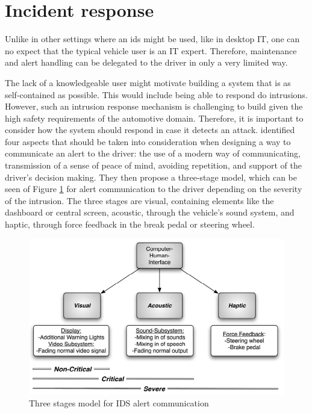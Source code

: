\section{Incident response}

Unlike in other settings where an \gls{ids} might be used, like in desktop IT, one can no expect that the typical vehicle user is an IT expert. Therefore, maintenance and alert handling can be delegated to the driver in only a very limited way.\par
The lack of a knowledgeable user might motivate building a system that is as self-contained as possible. This would include being able to respond do intrusions. However, such an intrusion response mechanism is challenging to build given the high safety requirements of the automotive domain. Therefore, it is important to consider how the system should respond in case it detects an attack. \cite{hoppe2009applying} identified four aspects that should be taken into consideration when designing a way to communicate an alert to the driver: the use of a modern way of communicating, transmission of a sense of peace of mind, avoiding repetition, and support of the driver's decision making. They then propose a three-stage model, which can be seen of Figure \ref{fig:ids_adaptive_dynamic_reaction} for alert communication to the driver depending on the severity of the intrusion. The three stages are visual, containing elements like the dashboard or central screen, acoustic, through the vehicle's sound system, and haptic, through force feedback in the break pedal or steering wheel.

\begin{figure}
    \centering
    \includegraphics[width = \textwidth]{img/parts/app/Adaptive IDS Alarm System.png}
    \caption{Three stages model for IDS alert communication \citep{hoppe2009applying}}
    \label{fig:ids_adaptive_dynamic_reaction}
\end{figure}

